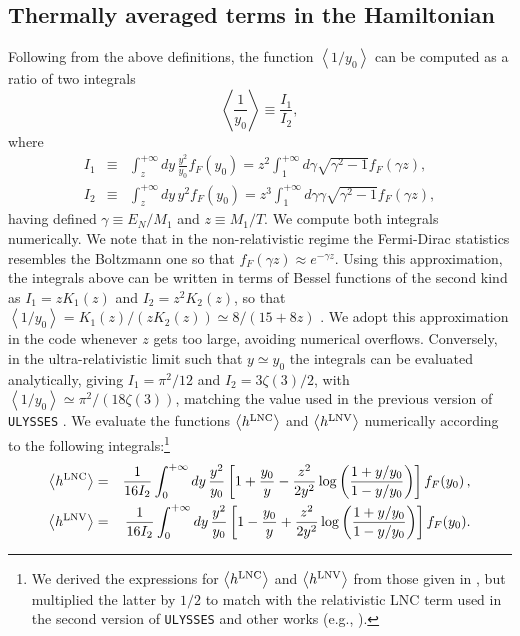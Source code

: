 \documentclass[12pt, a4paper]{article}
\begin{document}
\subsection{Thermally averaged terms in the Hamiltonian}
Following from the above definitions, the function $\left\langle 1/y_0 \right \rangle$ can be computed as a ratio of two integrals 
\begin{equation}
\left\langle \frac{1}{y_0} \right \rangle \equiv \frac{I_1}{I_2},
\end{equation}
where
\begin{eqnarray}
 I_1 &\equiv& \int_z^{+\infty} dy\, \frac{y^2}{y_0} f_F(y_0) =z^2 \int_1^{+\infty} d\gamma \sqrt{\gamma^2 - 1} f_F(\gamma z),\\
 I_2 &\equiv& \int_z^{+\infty} dy\, y^2 f_F(y_0)= z^3 \int_1^{+\infty} d\gamma \gamma \sqrt{\gamma^2 - 1} f_F(\gamma z),
\end{eqnarray}
having defined $\gamma \equiv E_N/M_1$ and $z \equiv M_1/T$. We compute both integrals numerically. We note that in the non-relativistic regime the Fermi-Dirac statistics resembles the Boltzmann one so that $f_F(\gamma z) \approx e^{-\gamma z}$. Using this approximation, the integrals above can be written in terms of Bessel functions of the second kind as $I_{1} = z K_{1}(z)$ and $I_2 = z^2 K_2(z)$, so that $\left\langle1/y_0\right\rangle = K_1(z)/(z K_2(z))\simeq 8/(15+8z)$ \cite{Buchmuller2005305}. We adopt this approximation in the code whenever $z$ gets too large, avoiding numerical overflows. Conversely, in the ultra-relativistic limit such that $y\simeq y_0$ the integrals can be evaluated analytically, giving $I_1 = \pi^2/12$ and $I_2 = 3\zeta(3)/2$, with $\left\langle 1/y_0 \right \rangle \simeq \pi^2/(18\zeta(3))$, matching the value used in the previous version of \texttt{ULYSSES} \cite{Granelli:2023vcm}.
%
We evaluate the functions $\left\langle h^{\rm LNC} \right \rangle$ and $\left \langle h^{\rm LNV}\right \rangle$ numerically according to the following integrals:\footnote{We derived the expressions for $\left\langle h^{\rm LNC} \right \rangle$ and $\left \langle h^{\rm LNV}\right \rangle$ from those given in \cite{Antusch:2017pkq}, but multiplied the latter by $1/2$ to match with the relativistic LNC term used in the second version of \texttt{ULYSSES} \cite{Granelli:2023vcm} and other works (e.g., \cite{Abada:2018oly, Hernandez:2022ivz}).} 
\begin{eqnarray}
 \left\langle h^{\rm LNC} \right\rangle &=& \frac{1}{16 I_2} \int_0^{+\infty} dy\, \frac{y^2}{y_0} \left[1 + \frac{y_0}{y}-\frac{z^2}{2y^2} \log\left(\frac{1+y/y_0}{1-y/y_0}\right) \right] f_F(y_0)\,, \\
 \left\langle h^{\rm LNV} \right\rangle &=& \frac{1}{16 I_2} \int_0^{+\infty} dy\, \frac{y^2}{y_0} \left[ 1 - \frac{y_0}{y} + \frac{z^2}{2y^2}\log\left(\frac{1+y/y_0}{1-y/y_0}\right) \right] f_F(y_0). 
\end{eqnarray}
\end{document}
